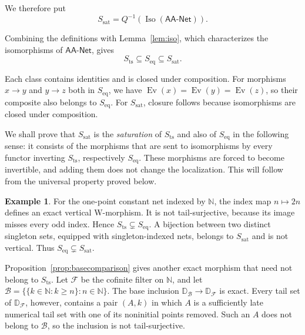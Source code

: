 \documentclass[11pt,a4paper]{article}
\theoremstyle{definition}
\newtheorem{example}[theorem]{Example}
\theoremstyle{remark}
\newcommand{\NetAA}{\mathsf{AA\text{-}Net}}
\newcommand{\FF}{\mathcal F}
\newcommand{\BB}{\mathcal B}
\newcommand{\NN}{\mathbb N}
\newcommand{\Ev}{\operatorname{Ev}}
\newcommand{\Iso}{\operatorname{Iso}}
\newcommand{\Sts}{S_{\mathrm{ts}}}
\newcommand{\Seq}{S_{\mathrm{eq}}}
\newcommand{\Ssat}{S_{\mathrm{sat}}}
\begin{document}
We therefore put
\begin{equation}\label{eq:ssat}
 \Ssat=Q^{-1}(\Iso(\NetAA)).
\end{equation}

Combining the definitions with Lemma~\ref{lem:iso}, which characterizes
the isomorphisms of \(\NetAA\), gives
\begin{equation}\label{eq:classes}
 \Sts\subseteq\Seq\subseteq\Ssat.
\end{equation}

Each class contains identities and is closed under composition.
For morphisms \(x\to y\) and \(y\to z\) both in \(\Seq\),
we have \(\Ev(x)=\Ev(y)=\Ev(z)\), so their composite also
belongs to \(\Seq\). For \(\Ssat\), closure follows because
isomorphisms are closed under composition.

We shall prove that \(\Ssat\) is the \emph{saturation} of
\(\Sts\) and also of \(\Seq\) in the following sense: it consists of
the morphisms that are sent to isomorphisms by every functor inverting
\(\Sts\), respectively \(\Seq\). These morphisms are forced to become invertible,
and adding them does not change the localization. This will follow
from the universal property proved below.

\begin{example}\label{ex:classes}
For the one-point constant net indexed by \(\NN\), the index map
\(n\mapsto2n\) defines an exact vertical W-morphism. It is not
tail-surjective, because its image misses every odd index. Hence
\(\Sts\subsetneq\Seq\). A bijection between two distinct
singleton sets, equipped with singleton-indexed nets, belongs to
\(\Ssat\) and is not vertical. Thus \(\Seq\subsetneq\Ssat\).

Proposition~\ref{prop:basecomparison} gives another exact morphism
that need not belong to \(\Sts\). Let \(\FF\) be the cofinite
filter on \(\NN\), and let
\(\BB=\{\{k\in\NN:k\ge n\}:n\in\NN\}\).
The base inclusion \(\mathbb D_{\BB}\to\mathbb D_{\FF}\)
is exact. Every tail set of \(\mathbb D_{\FF}\), however, contains
a pair \((A,k)\) in which \(A\) is a sufficiently late numerical
tail set with one of its noninitial points removed. Such an \(A\)
does not belong to \(\BB\), so the inclusion is not
tail-surjective.
\end{example}
\end{document}
